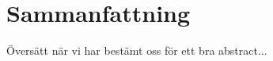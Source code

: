 






\section*{Sammanfattning}
Översätt när vi har bestämt oss för ett bra abstract...



\newpage				%
\thispagestyle{empty}
\mbox{}